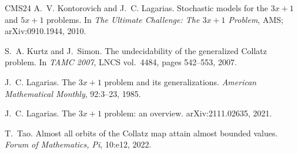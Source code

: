 \documentclass[11pt]{article}
\theoremstyle{definition}
\theoremstyle{remark}
\begin{document}
\begin{thebibliography}{CMS24}
A.~V. Kontorovich and J.~C. Lagarias.
\newblock Stochastic models for the $3x+1$ and $5x+1$ problems.
\newblock In \emph{The Ultimate Challenge: The $3x+1$ Problem}, AMS;
  arXiv:0910.1944, 2010.

S.~A. Kurtz and J.~Simon.
\newblock The undecidability of the generalized Collatz problem.
\newblock In \emph{TAMC 2007}, LNCS vol.~4484, pages 542--553, 2007.

J.~C. Lagarias.
\newblock The $3x+1$ problem and its generalizations.
\newblock \emph{American Mathematical Monthly}, 92:3--23, 1985.

J.~C. Lagarias.
\newblock The $3x+1$ problem: an overview.
\newblock arXiv:2111.02635, 2021.

T.~Tao.
\newblock Almost all orbits of the Collatz map attain almost bounded values.
\newblock \emph{Forum of Mathematics, Pi}, 10:e12, 2022.

\end{thebibliography}
\end{document}
